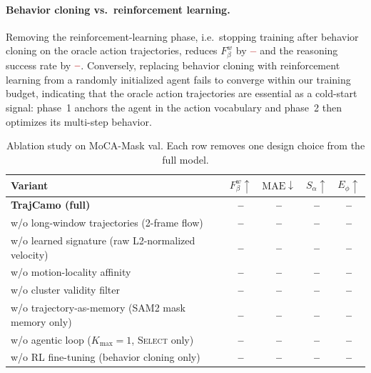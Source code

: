 \documentclass[11pt]{article}
\newcommand{\TBD}{\textcolor{red!70!black}{\textbf{--}}}
\begin{document}
\paragraph{Behavior cloning vs.\ reinforcement learning.}
Removing the reinforcement-learning phase, i.e.\ stopping training after behavior cloning on the oracle action trajectories, reduces $F^w_\beta$ by $\TBD$ and the reasoning success rate by $\TBD$.
Conversely, replacing behavior cloning with reinforcement learning from a randomly initialized agent fails to converge within our training budget, indicating that the oracle action trajectories are essential as a cold-start signal: phase~1 anchors the agent in the action vocabulary and phase~2 then optimizes its multi-step behavior.

\begin{table}[t]
\centering
\caption{Ablation study on MoCA-Mask val. Each row removes one design choice from the full model.}
\label{tab:abl}
\small
\begin{tabular}{lcccc}
\toprule
Variant & $F^w_\beta\uparrow$ & $\mathrm{MAE}\downarrow$ & $S_\alpha\uparrow$ & $E_\phi\uparrow$ \\
\midrule
\textbf{TrajCamo (full)}                              & \TBD & \TBD & \TBD & \TBD \\
\;\;w/o long-window trajectories (2-frame flow)       & \TBD & \TBD & \TBD & \TBD \\
\;\;w/o learned signature (raw L2-normalized velocity) & \TBD & \TBD & \TBD & \TBD \\
\;\;w/o motion-locality affinity                      & \TBD & \TBD & \TBD & \TBD \\
\;\;w/o cluster validity filter                       & \TBD & \TBD & \TBD & \TBD \\
\;\;w/o trajectory-as-memory (SAM2 mask memory only)  & \TBD & \TBD & \TBD & \TBD \\
\;\;w/o agentic loop ($K_{\max}{=}1$, \textsc{Select} only)  & \TBD & \TBD & \TBD & \TBD \\
\;\;w/o RL fine-tuning (behavior cloning only)        & \TBD & \TBD & \TBD & \TBD \\
\bottomrule
\end{tabular}
\end{table}
\end{document}
